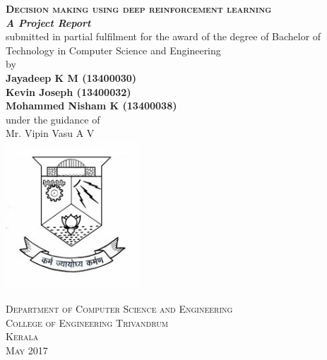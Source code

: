\documentclass[a4paper,12pt]{report}
\begin{document}
	\begin{titlepage}
		\begin{centering}
		 
		
		\textsc{\textbf{\LARGE{Decision making using deep reinforcement learning}}}\\[0.5cm]

		\textbf{\textit{\large{A Project Report}}}\\[1.5cm]

		\large{submitted in partial fulfilment for the award of the degree of Bachelor of Technology in Computer Science and Engineering}\\[1.5cm]

		\large{by}\\[0.5cm]

		\textbf{Jayadeep K M     (13400030)}\\
		\textbf{Kevin Joseph     (13400032)}\\
		\textbf{Mohammed Nisham K     (13400038)}\\[0.7cm]
		
		{under the guidance of}\\[0.25cm]
		\large{Mr. Vipin Vasu A V}\\[0.5cm]

		\includegraphics[width=5cm]{images/logo.jpg} 

		\textsc{Department of Computer Science and Engineering}\\
		\textsc{College of Engineering Trivandrum}\\
		\textsc{Kerala}\\[0.5cm]
		\textsc{May 2017}\\
		\vfill %
		\end{centering}
	\end{titlepage}
\end{document}
